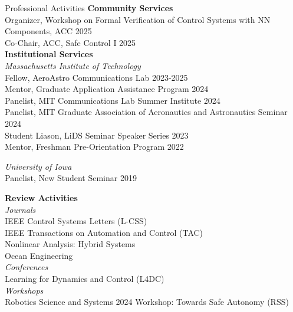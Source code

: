 \begin{rSection}{Professional Activities}
    \textbf{Community Services}\\
    Organizer,  Workshop on Formal Verification of Control Systems with NN Components, ACC \hfill 2025\\
    Co-Chair, ACC, Safe Control I \hfill 2025\\

    \pagebreak
    \textbf{Institutional Services}\\
    \textit{Massachusetts Institute of Technology}\\
    Fellow, AeroAstro Communications Lab \hfill 2023-2025\\
    Mentor, Graduate Application Assistance Program \hfill 2024\\
    Panelist, MIT Communications Lab Summer Institute \hfill 2024\\
    Panelist, MIT Graduate Association of Aeronautics and Astronautics Seminar \hfill 2024\\
    Student Liason, LiDS Seminar Speaker Series \hfill 2023\\
    Mentor, Freshman Pre-Orientation Program \hfill 2022

    \textit{University of Iowa}\\
    Panelist, New Student Seminar \hfill 2019

    \textbf{Review Activities}\\
    \textit{Journals}\\
    IEEE Control Systems Letters (L-CSS)\\
    IEEE Transactions on Automation and Control (TAC)\\
    Nonlinear Analysis: Hybrid Systems\\
    Ocean Engineering \\

    \textit{Conferences}\\
    Learning for Dynamics and Control (L4DC)\\

    \textit{Workshops}\\
    Robotics Science and Systems 2024 Workshop: Towards Safe Autonomy (RSS)

\end{rSection}